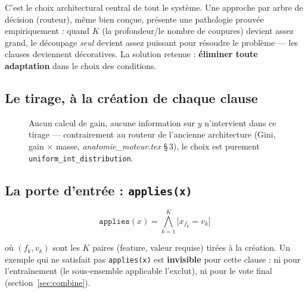 \documentclass[12pt,a4paper]{article}
\newcommand{\code}[1]{\texttt{#1}}
\theoremstyle{remark}
\begin{document}
C'est le choix architectural central de tout le système. Une approche par
arbre de décision (routeur), même bien conçue, présente une pathologie
prouvée empiriquement : quand $K$ (la profondeur/le nombre de coupures)
devient assez grand, le découpage \emph{seul} devient assez puissant pour
résoudre le problème --- les clauses deviennent décoratives. La solution
retenue : \textbf{éliminer toute adaptation} dans le choix des conditions.

\subsection{Le tirage, à la création de chaque clause}

\begin{figure}[h]
\centering
{}
\caption{Aucun calcul de gain, aucune information sur $y$ n'intervient dans ce
tirage --- contrairement au routeur de l'ancienne architecture (Gini, gain
$\times$ masse, \emph{anatomie\_moteur.tex} \S\,3), le choix est purement
\code{uniform\_int\_distribution}.}
\label{fig:stump-draw}
\end{figure}

\subsection{La porte d'entrée : \code{applies(x)}}

\[
  \code{applies}(x) = \bigwedge_{k=1}^{K} \big[x_{f_k} = v_k\big]
\]

où $(f_k,v_k)$ sont les $K$ paires (feature, valeur requise) tirées à la
création. Un exemple qui ne satisfait pas \code{applies(x)} est
\textbf{invisible} pour cette clause : ni pour l'entraînement (le
sous-ensemble applicable l'exclut), ni pour le vote final
(section~\ref{sec:combine}).
\end{document}
